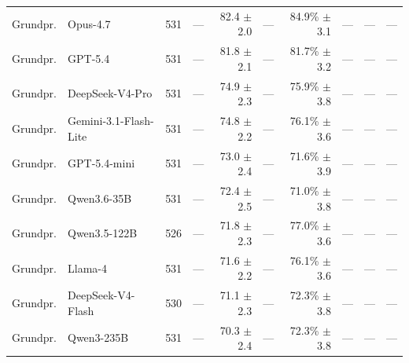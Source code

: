 \begin{table}[t]
{\begin{tabular}{llrrrrrrrr}
Grundpr. & Opus-4.7 & 531 & --- & \shortstack[r]{82.4\\{\scriptsize $\pm$2.0}} & --- & \shortstack[r]{84.9\%\\{\scriptsize $\pm$3.1}} & --- & --- & --- \\
Grundpr. & GPT-5.4 & 531 & --- & \shortstack[r]{81.8\\{\scriptsize $\pm$2.1}} & --- & \shortstack[r]{81.7\%\\{\scriptsize $\pm$3.2}} & --- & --- & --- \\
Grundpr. & DeepSeek-V4-Pro & 531 & --- & \shortstack[r]{74.9\\{\scriptsize $\pm$2.3}} & --- & \shortstack[r]{75.9\%\\{\scriptsize $\pm$3.8}} & --- & --- & --- \\
Grundpr. & Gemini-3.1-Flash-Lite & 531 & --- & \shortstack[r]{74.8\\{\scriptsize $\pm$2.2}} & --- & \shortstack[r]{76.1\%\\{\scriptsize $\pm$3.6}} & --- & --- & --- \\
Grundpr. & GPT-5.4-mini & 531 & --- & \shortstack[r]{73.0\\{\scriptsize $\pm$2.4}} & --- & \shortstack[r]{71.6\%\\{\scriptsize $\pm$3.9}} & --- & --- & --- \\
Grundpr. & Qwen3.6-35B & 531 & --- & \shortstack[r]{72.4\\{\scriptsize $\pm$2.5}} & --- & \shortstack[r]{71.0\%\\{\scriptsize $\pm$3.8}} & --- & --- & --- \\
Grundpr. & Qwen3.5-122B & 526 & --- & \shortstack[r]{71.8\\{\scriptsize $\pm$2.3}} & --- & \shortstack[r]{77.0\%\\{\scriptsize $\pm$3.6}} & --- & --- & --- \\
Grundpr. & Llama-4 & 531 & --- & \shortstack[r]{71.6\\{\scriptsize $\pm$2.2}} & --- & \shortstack[r]{76.1\%\\{\scriptsize $\pm$3.6}} & --- & --- & --- \\
Grundpr. & DeepSeek-V4-Flash & 530 & --- & \shortstack[r]{71.1\\{\scriptsize $\pm$2.3}} & --- & \shortstack[r]{72.3\%\\{\scriptsize $\pm$3.8}} & --- & --- & --- \\
Grundpr. & Qwen3-235B & 531 & --- & \shortstack[r]{70.3\\{\scriptsize $\pm$2.4}} & --- & \shortstack[r]{72.3\%\\{\scriptsize $\pm$3.8}} & --- & --- & --- \\
\bottomrule
\end{tabular}
}%
\end{table}
